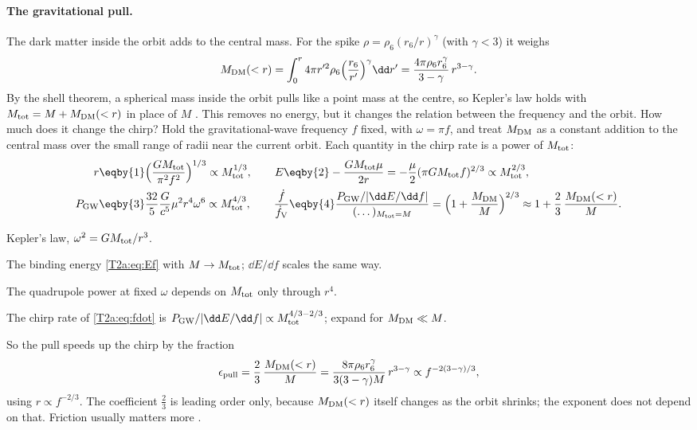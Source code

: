 \paragraph{The gravitational pull.}
The dark matter inside the orbit adds to the central mass. For the spike $\rho=\rho_6(r_6/r)^\gamma$ (with $\gamma<3$) it weighs
\[
  M_{\rm DM}(<r)=\int_0^r4\pi r'^2\rho_6\Big(\frac{r_6}{r'}\Big)^{\gamma}\dd r'=\frac{4\pi\rho_6r_6^{\gamma}}{3-\gamma}\,r^{3-\gamma}.
\]
By the shell theorem, a spherical mass inside the orbit pulls like a point mass at the centre, so Kepler's law holds with $M_{\rm tot}=M+M_{\rm DM}(<r)$ in place of $M$ \cite[eqs.~(9)--(11)]{Speeney2022}. This removes no energy, but it changes the relation between the frequency and the orbit. How much does it change the chirp? Hold the gravitational-wave frequency $f$ fixed, with $\omega=\pi f$, and treat $M_{\rm DM}$ as a constant addition to the central mass over the small range of radii near the current orbit. Each quantity in the chirp rate is a power of $M_{\rm tot}$:
\begin{align*}
  r&\eqby{1}\Big(\frac{GM_{\rm tot}}{\pi^2f^2}\Big)^{1/3}\propto M_{\rm tot}^{1/3},\qquad
  E\eqby{2}-\frac{GM_{\rm tot}\mu}{2r}=-\frac\mu2(\pi GM_{\rm tot}f)^{2/3}\propto M_{\rm tot}^{2/3},\\
  P_{\rm GW}&\eqby{3}\frac{32}{5}\frac{G}{c^5}\mu^2r^4\omega^6\propto M_{\rm tot}^{4/3},\qquad
  \frac{\dot f}{\dot f_{\rm V}}\eqby{4}\frac{P_{\rm GW}/\lvert\dd E/\dd f\rvert}{(\dots)_{M_{\rm tot}=M}}=\Big(1+\frac{M_{\rm DM}}{M}\Big)^{2/3}\approx1+\frac23\,\frac{M_{\rm DM}(<r)}{M}.
\end{align*}
\begin{explain}
  \item Kepler's law, $\omega^2=GM_{\rm tot}/r^3$.
  \item The binding energy \eqref{T2a:eq:Ef} with $M\to M_{\rm tot}$; $\dd E/\dd f$ scales the same way.
  \item The quadrupole power at fixed $\omega$ depends on $M_{\rm tot}$ only through $r^4$.
  \item The chirp rate of \eqref{T2a:eq:fdot} is $P_{\rm GW}/\lvert\dd E/\dd f\rvert\propto M_{\rm tot}^{4/3-2/3}$; expand for $M_{\rm DM}\ll M$.
\end{explain}
So the pull speeds up the chirp by the fraction
\[
  \epsilon_{\rm pull}=\frac23\,\frac{M_{\rm DM}(<r)}{M}=\frac{8\pi\rho_6r_6^\gamma}{3(3-\gamma)M}\,r^{3-\gamma}\propto f^{-2(3-\gamma)/3},
\]
using $r\propto f^{-2/3}$. The coefficient $\tfrac23$ is leading order only, because $M_{\rm DM}(<r)$ itself changes as the orbit shrinks; the exponent does not depend on that. Friction usually matters more \cite[Sec.~IX]{Barausse2014}.

